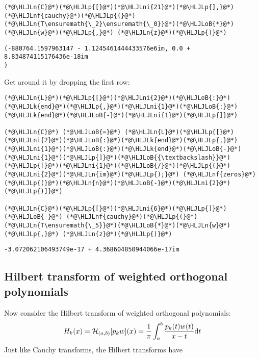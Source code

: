 \documentclass[12pt,landscape]{article}
\newcommand{\HLJLk}[1]{\textcolor[RGB]{148,91,176}{\textbf{#1}}}
\newcommand{\HLJLn}[1]{#1}
\newcommand{\HLJLnf}[1]{\textcolor[RGB]{66,102,213}{#1}}
\newcommand{\HLJLni}[1]{\textcolor[RGB]{59,151,46}{#1}}
\newcommand{\HLJLoB}[1]{\textcolor[RGB]{102,102,102}{\textbf{#1}}}
\newcommand{\HLJLp}[1]{#1}
\def\D{ {\rm d} }
\def\HH{ {\cal H} }
\def\dt{\D t}
\begin{document}
{\begin{lstlisting}
(*@\HLJLn{C}@*)(*@\HLJLp{[}@*)(*@\HLJLni{21}@*)(*@\HLJLp{],}@*) (*@\HLJLnf{cauchy}@*)(*@\HLJLp{(}@*)(*@\HLJLn{T\ensuremath{\_2}\ensuremath{\_0}}@*)(*@\HLJLoB{*}@*)(*@\HLJLn{w}@*)(*@\HLJLp{,}@*) (*@\HLJLn{z}@*)(*@\HLJLp{)}@*)
\end{lstlisting}

\begin{lstlisting}
(-880764.1597963147 - 1.1245461444433576e6im, 0.0 + 8.834874115176436e-18im
)
\end{lstlisting}


Get around it by dropping the first row:


\begin{lstlisting}
(*@\HLJLn{L}@*)(*@\HLJLp{[}@*)(*@\HLJLni{2}@*)(*@\HLJLoB{:}@*)(*@\HLJLk{end}@*)(*@\HLJLp{,}@*)(*@\HLJLni{1}@*)(*@\HLJLoB{:}@*)(*@\HLJLk{end}@*)(*@\HLJLoB{-}@*)(*@\HLJLni{1}@*)(*@\HLJLp{]}@*)

(*@\HLJLn{C}@*) (*@\HLJLoB{=}@*) (*@\HLJLn{L}@*)(*@\HLJLp{[}@*)(*@\HLJLni{2}@*)(*@\HLJLoB{:}@*)(*@\HLJLk{end}@*)(*@\HLJLp{,}@*)(*@\HLJLni{1}@*)(*@\HLJLoB{:}@*)(*@\HLJLk{end}@*)(*@\HLJLoB{-}@*)(*@\HLJLni{1}@*)(*@\HLJLp{]}@*)(*@\HLJLoB{{\textbackslash}}@*) (*@\HLJLp{[}@*)(*@\HLJLni{1}@*)(*@\HLJLoB{/}@*)(*@\HLJLp{(}@*)(*@\HLJLni{2}@*)(*@\HLJLn{im}@*)(*@\HLJLp{);}@*) (*@\HLJLnf{zeros}@*)(*@\HLJLp{(}@*)(*@\HLJLn{n}@*)(*@\HLJLoB{-}@*)(*@\HLJLni{2}@*)(*@\HLJLp{)]}@*)

(*@\HLJLn{C}@*)(*@\HLJLp{[}@*)(*@\HLJLni{6}@*)(*@\HLJLp{]}@*)(*@\HLJLoB{-}@*) (*@\HLJLnf{cauchy}@*)(*@\HLJLp{(}@*)(*@\HLJLn{T\ensuremath{\_5}}@*)(*@\HLJLoB{*}@*)(*@\HLJLn{w}@*)(*@\HLJLp{,}@*) (*@\HLJLn{z}@*)(*@\HLJLp{)}@*)
\end{lstlisting}

\begin{lstlisting}
-3.072062106493749e-17 + 4.368604850944066e-17im
\end{lstlisting}
\newpage
\subsection{Hilbert transform of weighted orthogonal polynomials}
Now consider the Hilbert transform of weighted orthogonal polynomials:
\[
H_k(x) = \HH_{(a,b)}[p_k w](x) = {1 \over \pi} \int_a^b {p_k(t) w(t) \over x-t} \dt
\]
Just like Cauchy transforms, the Hilbert transforms have

}
\end{document}
